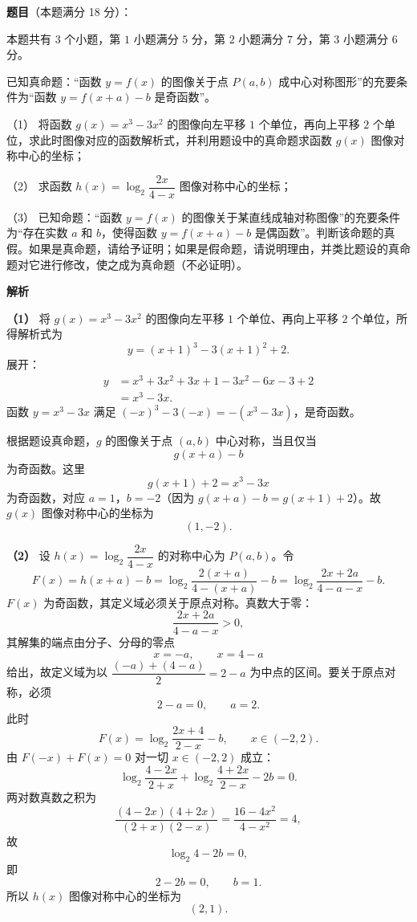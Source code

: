 \begin{answer}

\textbf{题目}（本题满分 18 分）：

本题共有 $3$ 个小题，第 $1$ 小题满分 $5$ 分，第 $2$ 小题满分 $7$ 分，第 $3$ 小题满分 $6$ 分。

已知真命题：“函数 $y=f(x)$ 的图像关于点 $P(a,b)$ 成中心对称图形”的充要条件为“函数 $y=f(x+a)-b$ 是奇函数”。

（1） 将函数 $g(x)=x^3-3x^2$ 的图像向左平移 $1$ 个单位，再向上平移 $2$ 个单位，求此时图像对应的函数解析式，并利用题设中的真命题求函数 $g(x)$ 图像对称中心的坐标；

（2） 求函数 $h(x)=\log_2\dfrac{2x}{4-x}$ 图像对称中心的坐标；

（3） 已知命题：“函数 $y=f(x)$ 的图像关于某直线成轴对称图像”的充要条件为“存在实数 $a$ 和 $b$，使得函数 $y=f(x+a)-b$ 是偶函数”。判断该命题的真假。如果是真命题，请给予证明；如果是假命题，请说明理由，并类比题设的真命题对它进行修改，使之成为真命题（不必证明）。

\textbf{解析}

\textbf{（1）} 将 $g(x)=x^3-3x^2$ 的图像向左平移 $1$ 个单位、再向上平移 $2$ 个单位，所得解析式为
\nopagebreak[4]
\[y=(x+1)^3-3(x+1)^2+2.\]
展开：
\nopagebreak[4]
\[\begin{aligned}
y&=x^3+3x^2+3x+1-3x^2-6x-3+2\\
&=x^3-3x.
\end{aligned}\]
函数 $y=x^3-3x$ 满足 $(-x)^3-3(-x)=-(x^3-3x)$，是奇函数。

根据题设真命题，$g$ 的图像关于点 $(a,b)$ 中心对称，当且仅当
\nopagebreak[4]
\[g(x+a)-b\]
为奇函数。这里
\nopagebreak[4]
\[g(x+1)+2=x^3-3x\]
为奇函数，对应 $a=1$，$b=-2$（因为 $g(x+a)-b=g(x+1)+2$）。故 $g(x)$ 图像对称中心的坐标为
\nopagebreak[4]
\[(1,-2).\]

\textbf{（2）} 设 $h(x)=\log_2\dfrac{2x}{4-x}$ 的对称中心为 $P(a,b)$。令
\nopagebreak[4]
\[F(x)=h(x+a)-b
=\log_2\frac{2(x+a)}{4-(x+a)}-b
=\log_2\frac{2x+2a}{4-a-x}-b.\]
$F(x)$ 为奇函数，其定义域必须关于原点对称。真数大于零：
\nopagebreak[4]
\[\frac{2x+2a}{4-a-x}>0,\]
其解集的端点由分子、分母的零点
\nopagebreak[4]
\[x=-a,\qquad x=4-a\]
给出，故定义域为以 $\dfrac{(-a)+(4-a)}2=2-a$ 为中点的区间。要关于原点对称，必须
\nopagebreak[4]
\[2-a=0,\qquad a=2.\]
此时
\nopagebreak[4]
\[F(x)=\log_2\frac{2x+4}{2-x}-b,\qquad x\in(-2,2).\]
由 $F(-x)+F(x)=0$ 对一切 $x\in(-2,2)$ 成立：
\nopagebreak[4]
\[\log_2\frac{4-2x}{2+x}+\log_2\frac{4+2x}{2-x}-2b=0.\]
两对数真数之积为
\nopagebreak[4]
\[\frac{(4-2x)(4+2x)}{(2+x)(2-x)}
=\frac{16-4x^2}{4-x^2}=4,\]
故
\nopagebreak[4]
\[\log_2 4-2b=0,\]
即
\nopagebreak[4]
\[2-2b=0,\qquad b=1.\]
所以 $h(x)$ 图像对称中心的坐标为
\nopagebreak[4]
\[(2,1).\]


\end{answer}
